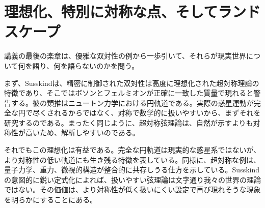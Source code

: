 \begin{classroomqa}
\end{classroomqa}

\begin{classroomqa}
\end{classroomqa}

\begin{classroomqa}
\end{classroomqa}

\section{理想化、特別に対称な点、そしてランドスケープ}

講義の最後の楽章は、優雅な双対性の例から一歩引いて、それらが現実世界について何を語り、何を語らないのかを問う。

まず、Susskindは、精密に制御された双対性は高度に理想化された超対称理論の特徴であり、そこではボソンとフェルミオンが正確に一致した質量で現れると警告する。彼の類推はニュートン力学における円軌道である。実際の惑星運動が完全な円で尽くされるからではなく、対称で数学的に扱いやすいから、まずそれを研究するのである。まったく同じように、超対称弦理論は、自然が示すよりも対称性が高いため、解析しやすいのである。

それでもこの理想化は有益である。完全な円軌道は現実的な惑星系ではないが、より対称性の低い軌道にも生き残る特徴を表している。同様に、超対称な例は、量子力学、重力、微視的構造が整合的に共存しうる仕方を示している。Susskindの意図的に鋭い定式化によれば、扱いやすい弦理論は文字通り我々の世界の理論ではない。その価値は、より対称性が低く扱いにくい設定で再び現れそうな現象を明らかにすることにある。

